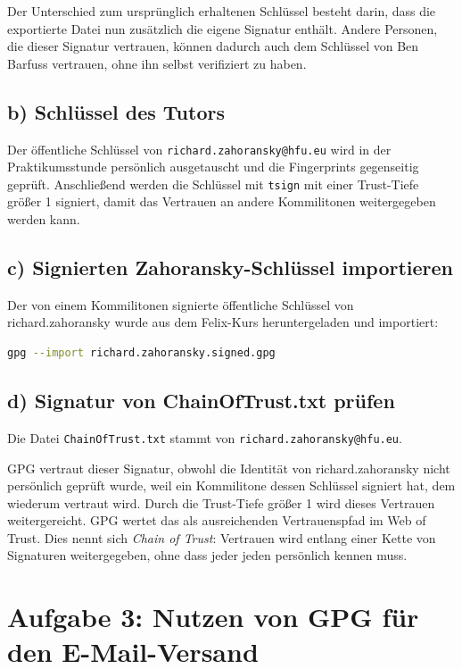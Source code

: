 \documentclass[
	fontsize=12pt,
	paper=a4,
	numbers=noenddot,
	listof=totoc,
	listof=entryprefix,
	listof=nochaptergap,
	bibliography=totoc,
	parskip=half,
	openany
]{scrbook}
\begin{document}
Der Unterschied zum ursprünglich erhaltenen Schlüssel besteht darin, dass die exportierte Datei
nun zusätzlich die eigene Signatur enthält.
Andere Personen, die dieser Signatur vertrauen, können dadurch auch dem Schlüssel von Ben Barfuss
vertrauen, ohne ihn selbst verifiziert zu haben.

\section*{b) Schlüssel des Tutors}

Der öffentliche Schlüssel von \texttt{richard.zahoransky@hfu.eu} wird in der Praktikumsstunde
persönlich ausgetauscht und die Fingerprints gegenseitig geprüft.
Anschließend werden die Schlüssel mit \texttt{tsign} mit einer Trust-Tiefe größer 1 signiert,
damit das Vertrauen an andere Kommilitonen weitergegeben werden kann.

\section*{c) Signierten Zahoransky-Schlüssel importieren}

Der von einem Kommilitonen signierte öffentliche Schlüssel von richard.zahoransky wurde aus dem
Felix-Kurs heruntergeladen und importiert:

\begin{lstlisting}[language=bash]
gpg --import richard.zahoransky.signed.gpg
\end{lstlisting}

\section*{d) Signatur von ChainOfTrust.txt prüfen}

Die Datei \texttt{ChainOfTrust.txt} stammt von \texttt{richard.zahoransky@hfu.eu}.

GPG vertraut dieser Signatur, obwohl die Identität von richard.zahoransky nicht persönlich geprüft wurde,
weil ein Kommilitone dessen Schlüssel signiert hat, dem wiederum vertraut wird.
Durch die Trust-Tiefe größer 1 wird dieses Vertrauen weitergereicht.
GPG wertet das als ausreichenden Vertrauenspfad im Web of Trust.
Dies nennt sich \textit{Chain of Trust}: Vertrauen wird entlang einer Kette von Signaturen weitergegeben,
ohne dass jeder jeden persönlich kennen muss.


\chapter*{Aufgabe 3: Nutzen von GPG für den E-Mail-Versand}
\end{document}
